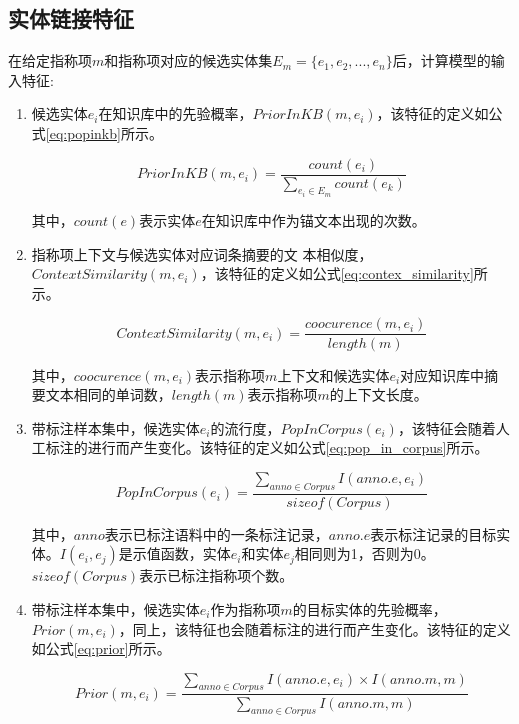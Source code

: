 \subsection{实体链接特征}\label{section:superised_feature}
在给定指称项$m$和指称项对应的候选实体集$E_m=\{e_1,e_2,...,e_n\}$后，计算模型的输入特征:

\begin{enumerate}
	\renewcommand{\labelenumi}{(\theenumi)}
	\item {候选实体$e_i$在知识库中的先验概率，$PriorInKB(m,e_i)$，该特征的定义如公式\ref{eq:popinkb}所示。
		
		\begin{equation}\label{eq:popinkb}
		PriorInKB(m,e_i)=\frac{count(e_i)}{\sum_{e_i\in E_m} {count(e_k)}}
		\end{equation}
		
		其中，$count(e)$表示实体$e$在知识库中作为锚文本出现的次数。
	}
	\item {指称项上下文与候选实体对应词条摘要的文 本相似度，$ContextSimilarity(m,e_i)$，该特征的定义如公式\ref{eq:contex_similarity}所示。
		
		\begin{equation}\label{eq:contex_similarity}
		ContextSimilarity(m,e_i)=\frac{coocurence(m,e_i)}{length(m)}
		\end{equation}
		
		其中，$coocurence(m,e_i)$表示指称项$m$上下文和候选实体$e_i$对应知识库中摘要文本相同的单词数，$length(m)$表示指称项$m$的上下文长度。
	}
	\item {带标注样本集中，候选实体$e_i$的流行度，$PopInCorpus(e_i)$，该特征会随着人工标注的进行而产生变化。该特征的定义如公式\ref{eq:pop_in_corpus}所示。
		
		\begin{equation}\label{eq:pop_in_corpus}
		PopInCorpus(e_i)=\frac{\sum_{anno \in Corpus} {I(anno.e,e_i)}}{sizeof(Corpus)}
		\end{equation}
		
		其中，$anno$表示已标注语料中的一条标注记录，$anno.e$表示标注记录的目标实体。$I(e_i,e_j)$是示值函数，实体$e_i$和实体$e_j$相同则为1，否则为0。$sizeof(Corpus)$表示已标注指称项个数。
	}
	\item{带标注样本集中，候选实体$e_i$作为指称项$m$的目标实体的先验概率，$Prior(m,e_i)$，同上，该特征也会随着标注的进行而产生变化。该特征的定义如公式\ref{eq:prior}所示。
		
		\begin{equation}\label{eq:prior}
		Prior(m,e_i)=\frac{\sum_{anno \in Corpus} {I(anno.e,e_i)\times I(anno.m,m)}}{\sum_{anno \in Corpus} {I(anno.m,m)}}
		\end{equation}
		
}
\end{enumerate}
